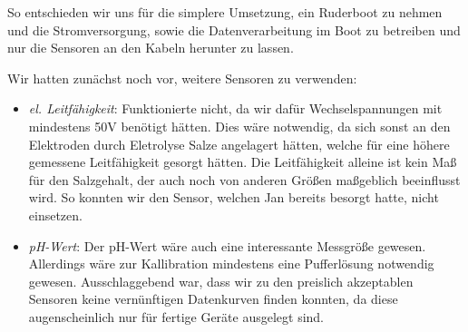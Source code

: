 \documentclass[12pt,a4paper,titlepage,headinclude,bibtotoc]{scrartcl}
\begin{document}
So entschieden wir uns für die simplere Umsetzung, ein Ruderboot zu nehmen und die Stromversorgung, sowie die Datenverarbeitung im Boot zu betreiben und nur die Sensoren an den Kabeln herunter zu lassen.


Wir hatten zunächst noch vor, weitere Sensoren zu verwenden:
\begin{itemize}
	\item \textit{el. Leitfähigkeit}: Funktionierte nicht, da wir dafür Wechselspannungen mit mindestens 50V benötigt hätten.
		Dies wäre notwendig, da sich sonst an den Elektroden durch Eletrolyse Salze angelagert hätten, welche für eine höhere gemessene Leitfähigkeit gesorgt hätten.
		Die Leitfähigkeit alleine ist kein Maß für den Salzgehalt, der auch noch von anderen Größen maßgeblich beeinflusst wird.
		So konnten wir den Sensor, welchen Jan bereits besorgt hatte, nicht einsetzen.
	\item \textit{pH-Wert}: Der pH-Wert wäre auch eine interessante Messgröße gewesen.
		Allerdings wäre zur Kallibration mindestens eine Pufferlösung notwendig gewesen.
		Ausschlaggebend war, dass wir zu den preislich akzeptablen Sensoren keine vernünftigen Datenkurven finden konnten, da diese augenscheinlich nur für fertige Geräte ausgelegt sind.
\end{itemize}




\end{document}
